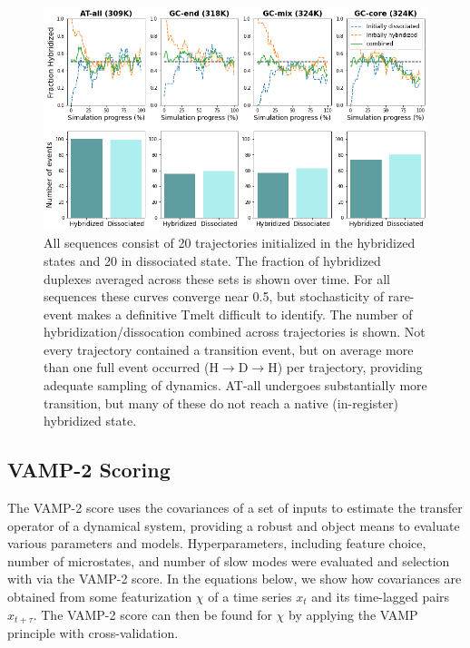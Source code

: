 \documentclass[journal=jpcbfk,manuscript=article]{achemso}
\begin{document}

\begin{figure}[ht!]
	\begin{center}
        \includegraphics[width=120mm, 
        scale=0.5]{Figs/figs_imp/allseq_event_count.png}
        \caption{All sequences consist of 20 trajectories initialized in the hybridized states and 20 in dissociated state. The fraction of hybridized duplexes averaged across these sets is shown over time. For all sequences these curves converge near 0.5, but stochasticity of rare-event makes a definitive Tmelt difficult to identify. The number of hybridization/dissocation combined across trajectories is shown. Not every trajectory contained a transition event, but on average more than one full event occurred (H$\rightarrow$D$\rightarrow$H) per trajectory, providing adequate sampling of dynamics. AT-all undergoes substantially more transition, but many of these do not reach a native (in-register) hybridized state.}
        \label{fig:allseq_event_count}
	\end{center}
\end{figure}

\subsection{VAMP-2 Scoring}
The VAMP-2 score uses the covariances of a set of inputs to estimate the transfer operator of a dynamical system, providing a robust and object means to evaluate various parameters and models. Hyperparameters, including feature choice, number of microstates, and number of slow modes were evaluated and selection with via the VAMP-2 score. In the equations below, we show how covariances are obtained from some featurization $\chi$ of a time series $x_t$ and its time-lagged pairs $x_{t+\tau}$. The VAMP-2 score can then be found for $\chi$ by applying the VAMP principle with cross-validation.
\end{document}
